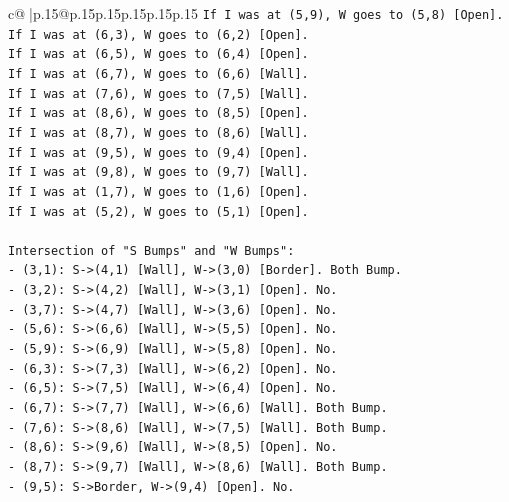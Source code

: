 \documentclass{article}
\begin{document}
{\begin{supertabular}{c@{$\;$}|p{.15\linewidth}@{}p{.15\linewidth}p{.15\linewidth}p{.15\linewidth}p{.15\linewidth}p{.15\linewidth}}
{{{\texttt{If I was at (5,9), W goes to (5,8) {[}Open{]}.} \\
\texttt{If I was at (6,3), W goes to (6,2) {[}Open{]}.} \\
\texttt{If I was at (6,5), W goes to (6,4) {[}Open{]}.} \\
\texttt{If I was at (6,7), W goes to (6,6) {[}Wall{]}.} \\
\texttt{If I was at (7,6), W goes to (7,5) {[}Wall{]}.} \\
\texttt{If I was at (8,6), W goes to (8,5) {[}Open{]}.} \\
\texttt{If I was at (8,7), W goes to (8,6) {[}Wall{]}.} \\
\texttt{If I was at (9,5), W goes to (9,4) {[}Open{]}.} \\
\texttt{If I was at (9,8), W goes to (9,7) {[}Wall{]}.} \\
\texttt{If I was at (1,7), W goes to (1,6) {[}Open{]}.} \\
\texttt{If I was at (5,2), W goes to (5,1) {[}Open{]}.} \\
\\ 
\texttt{Intersection of "S Bumps" and "W Bumps":} \\
\texttt{{-} (3,1): S{-}>(4,1) {[}Wall{]}, W{-}>(3,0) {[}Border{]}. Both Bump.} \\
\texttt{{-} (3,2): S{-}>(4,2) {[}Wall{]}, W{-}>(3,1) {[}Open{]}. No.} \\
\texttt{{-} (3,7): S{-}>(4,7) {[}Wall{]}, W{-}>(3,6) {[}Open{]}. No.} \\
\texttt{{-} (5,6): S{-}>(6,6) {[}Wall{]}, W{-}>(5,5) {[}Open{]}. No.} \\
\texttt{{-} (5,9): S{-}>(6,9) {[}Wall{]}, W{-}>(5,8) {[}Open{]}. No.} \\
\texttt{{-} (6,3): S{-}>(7,3) {[}Wall{]}, W{-}>(6,2) {[}Open{]}. No.} \\
\texttt{{-} (6,5): S{-}>(7,5) {[}Wall{]}, W{-}>(6,4) {[}Open{]}. No.} \\
\texttt{{-} (6,7): S{-}>(7,7) {[}Wall{]}, W{-}>(6,6) {[}Wall{]}. Both Bump.} \\
\texttt{{-} (7,6): S{-}>(8,6) {[}Wall{]}, W{-}>(7,5) {[}Wall{]}. Both Bump.} \\
\texttt{{-} (8,6): S{-}>(9,6) {[}Wall{]}, W{-}>(8,5) {[}Open{]}. No.} \\
\texttt{{-} (8,7): S{-}>(9,7) {[}Wall{]}, W{-}>(8,6) {[}Wall{]}. Both Bump.} \\
\texttt{{-} (9,5): S{-}>Border, W{-}>(9,4) {[}Open{]}. No.} \\
}}}
\end{supertabular}}
\end{document}
